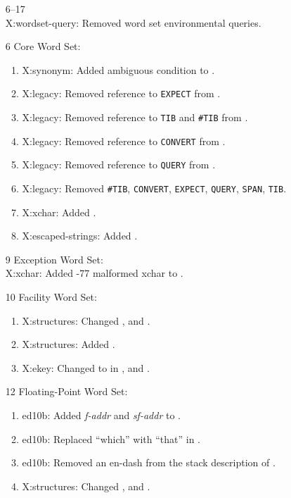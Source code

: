 \begin{itemize}
	\item[6--17] ~\\
		\textsf{X:wordset-query}: Removed word set environmental queries.

	\item[6] Core Word Set:
		\begin{enumerate}
		\item \textsf{X:synonym}: Added ambiguous condition to .
		\item \textsf{X:legacy}: Removed reference to \texttt{EXPECT} from
			.
		\item \textsf{X:legacy}: Removed reference to \texttt{TIB} and
			\texttt{\#TIB} from .
		\item \textsf{X:legacy}: Removed reference to \texttt{CONVERT} from
			.
		\item \textsf{X:legacy}: Removed reference to \texttt{QUERY} from
			.
		\item \textsf{X:legacy}: Removed \texttt{\#TIB},
			\texttt{CONVERT},
			\texttt{EXPECT},
			\texttt{QUERY},
			\texttt{SPAN},
			\texttt{TIB}.
		\item \textsf{X:xchar}: Added .
		\item \textsf{X:escaped-strings}: Added .
		\end{enumerate}

	\item[9] Exception Word Set: \\
		\textsf{X:xchar}: Added -77 malformed xchar to .

	\item[10] Facility Word Set:
		\begin{enumerate}
		\item \textsf{X:structures}: Changed ,
			and .
		\item \textsf{X:structures}: Added .
		\item \textsf{X:ekey}: Changed  to  in
			,
			 and \linebreak
			.
		\end{enumerate}

	\item[12] Floating-Point Word Set:
		\begin{enumerate}
		\item \textsf{ed10b}: Added \emph{f-addr} and \emph{sf-addr} to
			.
		\item \textsf{ed10b}: Replaced ``which'' with ``that'' in
			.
		\item \textsf{ed10b}: Removed an en-dash from the stack description of
			.
		\item \textsf{X:structures}: Changed ,
			 and
			.
		\end{enumerate}


\end{itemize}

